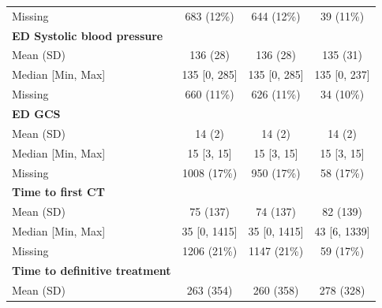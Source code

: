 \documentclass[12pt, a4paper]{article}
\begin{document}
\begin{table}[p]
{\begin{tabular}{lccc}
			\hspace{3mm}Missing                           & 683 (12\%)        & 644 (12\%)        & 39 (11\%)        \\
			\textbf{ED Systolic blood pressure}           &                   &                   &                  \\
			\hspace{3mm}Mean (SD)                         & 136 (28)          & 136 (28)          & 135 (31)         \\
			\hspace{3mm}Median [Min, Max]                 & 135 [0, 285]      & 135 [0, 285]      & 135 [0, 237]     \\
			\hspace{3mm}Missing                           & 660 (11\%)        & 626 (11\%)        & 34 (10\%)        \\
			\textbf{ED GCS}                               &                   &                   &                  \\
			\hspace{3mm}Mean (SD)                         & 14 (2)            & 14 (2)            & 14 (2)           \\
			\hspace{3mm}Median [Min, Max]                 & 15 [3, 15]        & 15 [3, 15]        & 15 [3, 15]       \\
			\hspace{3mm}Missing                           & 1008 (17\%)       & 950 (17\%)        & 58 (17\%)        \\
			\textbf{Time to first CT}                     &                   &                   &                  \\
			\hspace{3mm}Mean (SD)                         & 75 (137)          & 74 (137)          & 82 (139)         \\
			\hspace{3mm}Median [Min, Max]                 & 35 [0, 1415]      & 35 [0, 1415]      & 43 [6, 1339]     \\
			\hspace{3mm}Missing                           & 1206 (21\%)       & 1147 (21\%)       & 59 (17\%)        \\
			\textbf{Time to definitive treatment}         &                   &                   &                  \\
			\hspace{3mm}Mean (SD)                         & 263 (354)         & 260 (358)         & 278 (328)        \\

\end{tabular}}
\end{table}
\end{document}
